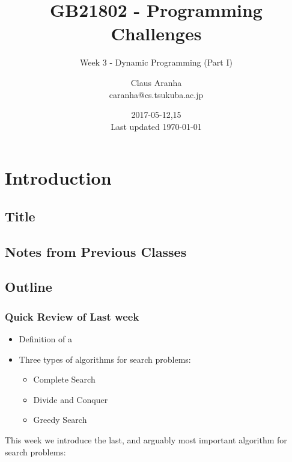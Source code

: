 \documentclass{beamer}
\title[GB21802]{GB21802 - Programming Challenges}
\subtitle[]{Week 3 - Dynamic Programming (Part I)}
\author[Claus Aranha]{Claus Aranha\\{\footnotesize caranha@cs.tsukuba.ac.jp}}
\institute{College of Information Science}
\date{2017-05-12,15\\{\tiny Last updated \today}}
\begin{document}
\section{Introduction}
\subsection{Title}
\begin{frame}
\maketitle
\end{frame}

\subsection{Notes from Previous Classes}



\subsection{Outline}

\begin{frame}
  \frametitle{Quick Review of Last week}
  \begin{itemize}
  \item Definition of a 
  \item Three types of algorithms for search problems:
    \begin{itemize}
    \item Complete Search
    \item Divide and Conquer
    \item Greedy Search
    \end{itemize}
  \end{itemize}

  \bigskip
  
  \begin{block}{}
    This week we introduce the last, and arguably most important
    algorithm for search problems: 
  \end{block}
\end{frame}
\end{document}
